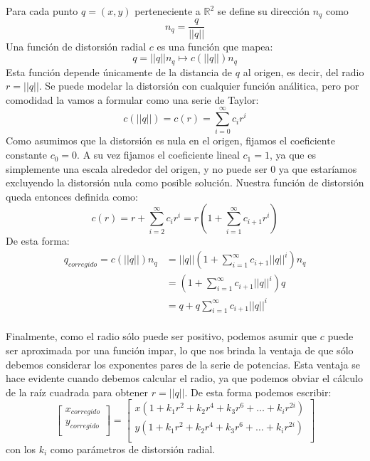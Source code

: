 Para cada punto $q = (x,y)$ perteneciente a $\mathbb{R}^2$ se define su dirección $n_q$ como
\begin{equation*}
    n_q = \frac{q}{||q||}
\end{equation*}
Una función de distorsión radial $c$ es una función que mapea:
\begin{equation*}
	q = ||q|| n_q   \mapsto   c(||q||) n_q
\end{equation*}
Esta función depende únicamente de la distancia de $q$ al origen, es decir, del radio $r = ||q||$. Se puede modelar la distorsión con cualquier función análitica, pero por comodidad la vamos a formular como una serie de Taylor:
\begin{equation*}
	c(||q||) = c(r) = \sum_{i=0}^{\infty} c_i r^i
\end{equation*}
Como asumimos que la distorsión es nula en el origen, fijamos el coeficiente constante $c_0 = 0$. A su vez fijamos el coeficiente lineal $c_1 = 1$, ya que es simplemente una escala alrededor del origen, y no puede ser $0$ ya que estaríamos excluyendo la distorsión nula como posible solución.
Nuestra función de distorsión queda entonces definida como:
\begin{equation*}
	c(r) = r + \sum_{i=2}^{\infty} c_i r^i = r (1 + \sum_{i=1}^{\infty} c_{i+1} r^i)
\end{equation*}
De esta forma:
\begin{equation*}
    \begin{aligned}
	q_{corregido} = c(||q||) n_q &= ||q|| (1 + \sum_{i=1}^{\infty} c_{i+1} ||q||^i) n_q\\
                                                         &= (1 + \sum_{i=1}^{\infty} c_{i+1} ||q||^i) q \\
                                                         &= q + q \sum_{i=1}^{\infty} c_{i+1} ||q||^i \\
    \end{aligned}
\end{equation*}	

Finalmente, como el radio sólo puede ser positivo, podemos asumir que $c$ puede ser aproximada por una función impar, lo que nos brinda la ventaja de que sólo debemos considerar los exponentes pares de la serie de potencias. Esta ventaja se hace evidente cuando debemos calcular el radio, ya que podemos obviar el cálculo de la raíz cuadrada para obtener $r = ||q||$.
De esta forma podemos escribir:
\begin{equation*}
	\begin{bmatrix}
	    x_{corregido} \\
	    y_{corregido} \\
	\end{bmatrix}
	= 
	\begin{bmatrix}
	    x (1 + k_1 r^2 + k_2 r^4 + k_3 r^6 + \dots + k_i r^{2i}) \\
	    y (1 + k_1 r^2 + k_2 r^4 + k_3 r^6 + \dots + k_i r^{2i}) \\
	\end{bmatrix}
\end{equation*}
con los $k_i$ como parámetros de distorsión radial.

